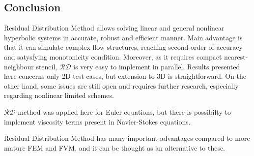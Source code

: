\documentclass[plainboxedsections, 17pt, b1]{sciposter}
\newcommand{\rd}{$\mathcal{RD}$}
\begin{document}
\begin{multicols}{3}
\section{Conclusion}
Residual Distribution Method allows solving linear and general nonlinear hyperbolic systems in accurate, robust and efficient manner. Main advantage is that it can simulate complex flow structures, reaching second order of accuracy and satysfying monotonicity condition. Moreover, as it requires compact nearest-neighbour stencil, \rd{} is very easy to implement in parallel. Results presented here concerns only 2D test cases, but extension to 3D is straightforward. On the other hand, some issues are still open and requires further research, especially regarding nonlinear limited schemes.

\rd{} method was applied here for Euler equations, but there is possibilty to implement viscosity terms present in Navier-Stokes equations.

Residual Distribution Method has many important advantages compared to more mature FEM and FVM, and it can be thought as an alternative to these.


\end{multicols}
\end{document}
